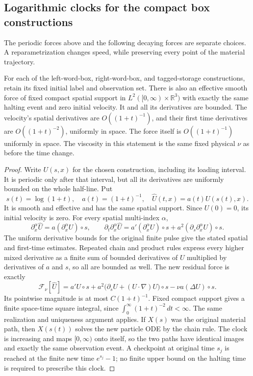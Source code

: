\subsection{Logarithmic clocks for the compact box constructions}
\label{subsec:sb-clock}
The periodic forces above and the following decaying forces are separate choices.  A reparametrization changes speed, while preserving every point of the material trajectory.

\begin{proposition}\label{prop:sb-log}
For each of the left-word-box, right-word-box, and tagged-storage constructions, retain its fixed initial label and observation set.  There is also an effective smooth force of fixed compact spatial support in
$L^2([0,\infty)\times\mathbb R^3)$ with exactly the same halting event and zero initial velocity.  It and all its derivatives are bounded.  The velocity's spatial derivatives are $O((1+t)^{-1})$, and their first time derivatives are $O((1+t)^{-2})$, uniformly in space.  The force itself is $O((1+t)^{-1})$ uniformly in space. The viscosity
in this statement is the same fixed physical $\nu$ as before the time
change.
\end{proposition}
\begin{proof}
Write $U(s,x)$ for the chosen construction, including its loading
interval. It is periodic only after that interval, but all its derivatives
are uniformly bounded on the whole half-line. Put
\[
 s(t)=\log(1+t),\quad a(t)=(1+t)^{-1},\quad
 \widehat U(t,x)=a(t)U(s(t),x).
\]
It is smooth and effective and has the same spatial support.  Since $U(0)=0$, its initial velocity is zero.  For every spatial multi-index $\alpha$,
\[
 \partial_x^\alpha\widehat U=a(\partial_x^\alpha U)\circ s,
 \qquad
 \partial_t\partial_x^\alpha\widehat U
   =a'(\partial_x^\alpha U)\circ s
       +a^2(\partial_s\partial_x^\alpha U)\circ s.
\]
The uniform derivative bounds for the original finite pulse give the stated spatial and first-time estimates.  Repeated chain and product rules express every higher mixed derivative as a finite sum of bounded derivatives of $U$ multiplied by derivatives of $a$ and $s$, so all are bounded as well.  The new residual force is exactly
\[
 \mathcal F_\nu[\widehat U]
  =a'U\circ s+a^2\big(\partial_sU+(U\cdot\nabla)U\big)\circ s
                -\nu a(\Delta U)\circ s.
\]
Its pointwise magnitude is at most $C(1+t)^{-1}$.  Fixed compact support gives a finite space-time square integral, since $\int_0^\infty(1+t)^{-2}\,dt<\infty$.  The same realization and uniqueness argument applies.  If $X(s)$ was the original material path, then $X(s(t))$ solves the new particle ODE by the chain rule.  The clock is increasing and maps $[0,\infty)$ onto itself, so the two paths have identical images and exactly the same observation event.  A checkpoint at original time $s_j$ is reached at the finite new time $e^{s_j}-1$; no finite upper bound on the halting time is required to prescribe this clock.
\end{proof}
